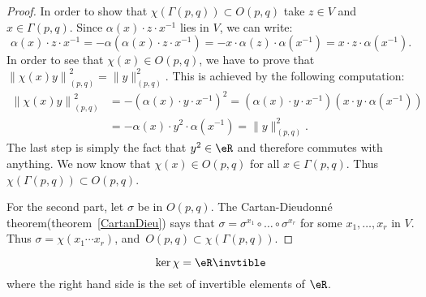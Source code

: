 \begin{proof}
In order to show that $\chi(\Gamma(p,q))\subset O(p,q)$ take $z\in V$ and $x\in\Gamma(p,q)$. Since $\alpha(x)\cdot z\cdot x^{-1}$ lies in $V$, we can write:
\[
\alpha(x)\cdot z\cdot x^{-1}=-\alpha\left(\alpha(x)\cdot z\cdot x^{-1}\right)
=-x\cdot\alpha(z)\cdot\alpha(x^{-1})=x\cdot z\cdot\alpha(x^{-1}).
\]
In order to see that $\chi(x)\in O(p,q)$, we have to prove that $\left\|\chi(x)y\right\|_{(p,q)}^2=\|y\|_{(p,q)}^2$. This is achieved by the following computation:
\begin{equation}
\begin{split}
 \left\|\chi(x)y\right\|_{(p,q)}^2&=-\left(\alpha(x)\cdot y\cdot x^{-1}\right)^2
                                  =\left(\alpha(x)\cdot y\cdot x^{-1}\right)\left(x\cdot y\cdot\alpha(x^{-1})\right)\\
                                  &=-\alpha(x)\cdot y^2\cdot\alpha(x^{-1})
                                  =\|y\|^2_{(p,q)}.
\end{split}
\end{equation}
The last step is simply the fact that $y^2\in\eR$ and therefore commutes with anything. We now know that $\chi(x)\in O(p,q)$ for all $x\in\Gamma(p,q)$. Thus $\chi(\Gamma(p,q))\subset O(p,q)$.

For the second part, let $\sigma$ be in $O(p,q)$. The Cartan-Dieudonné theorem(theorem~\ref{CartanDieu}) says that $\sigma=\sigma^{x_1}\circ\ldots\circ\sigma^{x_r}$ for some $x_1,\ldots, x_r$ in $V$. Thus $\sigma=\chi(x_1\cdots x_r)$, \hbox{and $O(p,q)\subset\chi(\Gamma(p,q))$}.
\end{proof}

\begin{proposition}
\begin{equation}
      \ker\chi=\eR\invtible
\end{equation}
where the right hand side is the set of invertible elements of $\eR$.
\label{prop1001p1}
\end{proposition}

